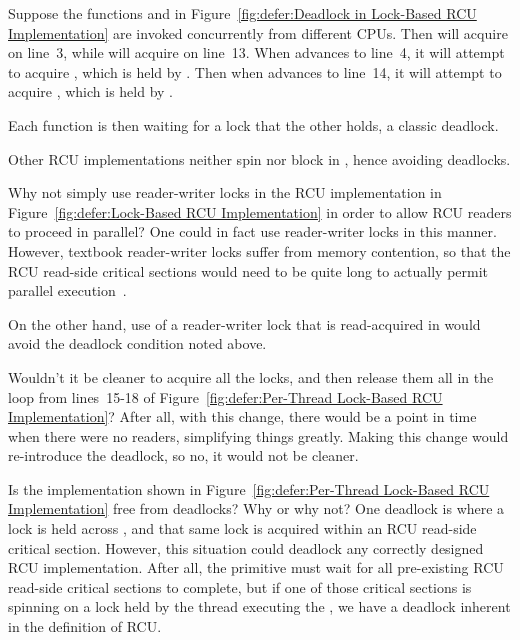 \begin{enumerate}
	Suppose the functions  and  in
	Figure~\ref{fig:defer:Deadlock in Lock-Based RCU Implementation}
	are invoked concurrently from different CPUs.
	Then  will acquire  on line~3,
	while  will acquire  on
	line~13.
	When  advances to line~4, it will attempt to
	acquire , which is held by .
	Then when  advances to line~14, it will attempt
	to acquire , which is held by .

	Each function is then waiting for a lock that the other
	holds, a classic deadlock.

	Other RCU implementations neither spin nor block in
	, hence avoiding deadlocks.

\QuickQ{}
	Why not simply use reader-writer locks in the RCU implementation
	in
	Figure~\ref{fig:defer:Lock-Based RCU Implementation}
	in order to allow RCU readers to proceed in parallel?
\QuickA{}
	One could in fact use reader-writer locks in this manner.
	However, textbook reader-writer locks suffer from memory
	contention, so that the RCU read-side critical sections would
	need to be quite long to actually permit parallel
	execution~\cite{McKenney03a}.

	On the other hand, use of a reader-writer lock that is
	read-acquired in  would avoid the
	deadlock condition noted above.

\QuickQ{}
	Wouldn't it be cleaner to acquire all the locks, and then
	release them all in the loop from lines~15-18 of
	Figure~\ref{fig:defer:Per-Thread Lock-Based RCU Implementation}?
	After all, with this change, there would be a point in time
	when there were no readers, simplifying things greatly.
\QuickA{}
	Making this change would re-introduce the deadlock, so
	no, it would not be cleaner.

\QuickQ{}
	Is the implementation shown in
	Figure~\ref{fig:defer:Per-Thread Lock-Based RCU Implementation}
	free from deadlocks?
	Why or why not?
\QuickA{}
	One deadlock is where a lock is
	held across , and that same lock is
	acquired within an RCU read-side critical section.
	However, this situation could deadlock any correctly designed
	RCU implementation.
	After all, the  primitive must wait for all
	pre-existing RCU read-side critical sections to complete,
	but if one of those critical sections is spinning on a lock
	held by the thread executing the ,
	we have a deadlock inherent in the definition of RCU.


\end{enumerate}
